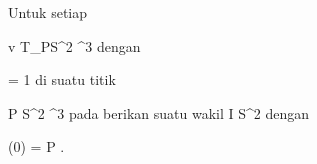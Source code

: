 {

Untuk setiap

\mavergleichskette
{\vergleichskette
{ v
}
{ \in }{ T_PS^2
}
{ \subseteq }{ \R^3
}
{    }{
}
{   }{
}
}
{}{}{}
dengan

\mavergleichskette
{\vergleichskette
{  \Vert
}
{ = }{ 1
}
{  }{
}
{    }{
}
{   }{
}
}
{}{}{}
di suatu titik

\mavergleichskette
{\vergleichskette
{ P
}
{ \in }{ S^2
}
{ \subset }{ \R^3
}
{    }{
}
{   }{
}
}
{}{}{}
pada
berikan suatu wakil
\maabbdisp {\gamma} { I } { S^2
} {}
dengan

\mavergleichskette
{\vergleichskette
{ \gamma(0)
}
{ = }{ P
}
{  }{
}
{    }{
}
{   }{
}
}
{}{}{.}

}
